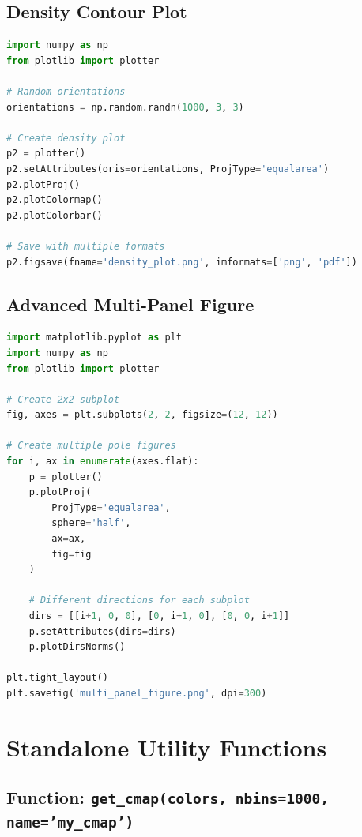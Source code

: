\documentclass[11pt,a4paper]{article}
\begin{document}
\subsection{Density Contour Plot}

\begin{lstlisting}[language=Python, caption=Creating an orientation density plot]
import numpy as np
from plotlib import plotter

# Random orientations
orientations = np.random.randn(1000, 3, 3)

# Create density plot
p2 = plotter()
p2.setAttributes(oris=orientations, ProjType='equalarea')
p2.plotProj()
p2.plotColormap()
p2.plotColorbar()

# Save with multiple formats
p2.figsave(fname='density_plot.png', imformats=['png', 'pdf'])
\end{lstlisting}

\subsection{Advanced Multi-Panel Figure}

\begin{lstlisting}[language=Python, caption=Creating a multi-panel crystallographic figure]
import matplotlib.pyplot as plt
import numpy as np
from plotlib import plotter

# Create 2x2 subplot
fig, axes = plt.subplots(2, 2, figsize=(12, 12))

# Create multiple pole figures
for i, ax in enumerate(axes.flat):
    p = plotter()
    p.plotProj(
        ProjType='equalarea',
        sphere='half',
        ax=ax,
        fig=fig
    )
    
    # Different directions for each subplot
    dirs = [[i+1, 0, 0], [0, i+1, 0], [0, 0, i+1]]
    p.setAttributes(dirs=dirs)
    p.plotDirsNorms()

plt.tight_layout()
plt.savefig('multi_panel_figure.png', dpi=300)
\end{lstlisting}

\section{Standalone Utility Functions}

\subsection{Function: \texttt{get\_cmap(colors, nbins=1000, name='my\_cmap')}}
\end{document}
